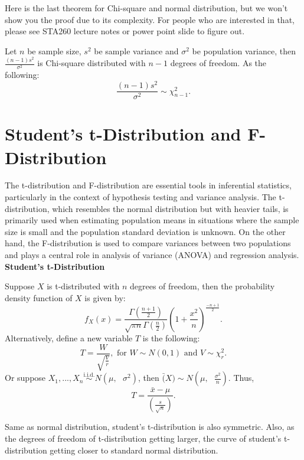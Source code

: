 \noindent
Here is the last theorem for Chi-square and normal distribution, but we won't show you the proof due to its complexity. For people who are interested in that, please see STA260 lecture notes or power point slide to figure out.

\begin{thm}
Let $n$ be sample size, $s^2$ be sample variance and $\sigma^2$ be population variance, then $\frac{(n-1)s^2}{\sigma^2}$ is Chi-square distributed with $n - 1$ degrees of freedom. As the following: \[ \frac{(n-1)s^2}{\sigma^2} \sim \chi_{n-1}^{2}.\]
\end{thm}

\section{Student's t-Distribution and F-Distribution}

The t-distribution and F-distribution are essential tools in inferential statistics, particularly in the context of hypothesis testing and variance analysis. The t-distribution, which resembles the normal distribution but with heavier tails, is primarily used when estimating population means in situations where the sample size is small and the population standard deviation is unknown. On the other hand, the F-distribution is used to compare variances between two populations and plays a central role in analysis of variance (ANOVA) and regression analysis.\\

\noindent
\textbf{Student's t-Distribution}

\begin{definition}
Suppose $X$ is t-distributed with $n$ degrees of freedom, then the probability density function of $X$ is given by: \[ f_{X}(x) = \frac{\Gamma(\frac{n+1}{2})}{\sqrt{\pi n} \Gamma(\frac{n}{2})} (1+\frac{x^2}{n})^{\frac{-n+1}{2}}.\]
Alternatively, define a new variable $T$ is the following: \[ T = \frac{W}{\sqrt{\frac{V}{r}}}, \text{ for $W \sim N(0, 1)  \text{ and } V \sim \chi_{r}^{2}$.}\]
Or suppose $X_1, ..., X_n \overset{\text{i.i.d.}}{\sim} N(\mu, \text{ } \sigma^2)$, then $\bar(X) \sim N(\mu, \text{ } \frac{\sigma^2}{n})$. Thus, \[ T = \frac{ \bar{x} - \mu}{(\frac{s}{\sqrt{n}})}.\]
\end{definition}

\noindent
Same as normal distribution, student's t-distribution is also symmetric. Also, as the degrees of freedom of t-distribution getting larger, the curve of student's t-distribution getting closer to standard normal distribution.\\

